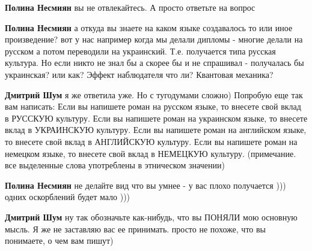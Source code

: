 \begin{itemize}
\begin{itemize}
\textbf{Полина Несмиян} вы не отвлекайтесь. А просто ответьте на вопрос

 
\textbf{Полина Несмиян} а откуда вы знаете на каком языке создавалось то или
иное произведение? вот у нас например когда мы делали дипломы - многие делали
на русском а потом переводили на украинский. Т.е. получается типа русская
культура. Но если никто не знал бы а скорее бы и не спрашивал - получалась бы
украинская? или как? Эффект наблюдателя что ли? Квантовая механика?

 
\textbf{Дмитрий Шум} я же ответила уже. Но с тугодумами сложно) Попробую еще
так вам написать: Если вы напишете роман на русском языке, то внесете свой
вклад в РУССКУЮ культуру. Если вы напишете роман на украинском языке, то
внесете вклад в УКРАИНСКУЮ культуру. Если вы напишете роман на английском
языке, то внесете свой вклад в АНГЛИЙСКУЮ культуру. Если вы напишете роман на
немецком языке, то внесете свой вклад в НЕМЕЦКУЮ культуру. (примечание. все
выделенные слова употреблены в этническом значении)

 
\textbf{Полина Несмиян} не делайте вид что вы умнее - у вас плохо получается
))) одних оскорблений будет мало )))

 
\textbf{Дмитрий Шум} ну так обозначьте как-нибудь, что вы ПОНЯЛИ мою основную
мысль. Я же не заставляю вас ее принимать. просто не похоже, что вы понимаете,
о чем вам пишут)


\end{itemize}
\end{itemize}
